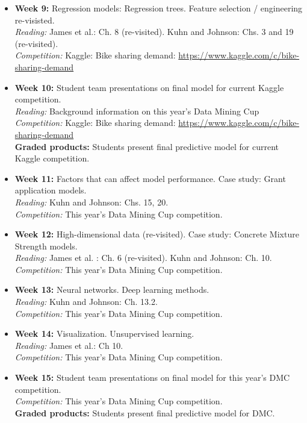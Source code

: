 \documentclass[11pt,oneside]{amsart}
\begin{document}
\begin{itemize}
\item \textbf{Week 9:} Regression models: Regression trees. Feature selection /
  engineering re-visisted.\\
\emph{Reading:} James et al.: Ch. 8 (re-visited). Kuhn and Johnson:
Chs. 3 and 19 (re-visited).\\
\emph{Competition:} Kaggle: Bike sharing demand: \url{https://www.kaggle.com/c/bike-sharing-demand}

\item \textbf{Week 10:} Student team presentations on final model for current Kaggle
  competition.\\
\emph{Reading:} Background information on this year's Data Mining Cup\\
\emph{Competition:} Kaggle: Bike sharing demand: \url{https://www.kaggle.com/c/bike-sharing-demand}\\
\textbf{Graded products:} Students present final predictive model for
current Kaggle competition.\\

\item \textbf{Week 11:} Factors that can affect model performance. Case study: Grant application models. \\
\emph{Reading:} Kuhn and Johnson: Chs. 15, 20. \\
\emph{Competition:} This year's Data Mining Cup competition.

\item \textbf{Week 12:} High-dimensional data (re-visited). Case study: Concrete Mixture Strength models.\\
\emph{Reading:} James et al. : Ch. 6 (re-visited). Kuhn and Johnson: Ch. 10.\\
\emph{Competition:} This year's Data Mining Cup competition.

\item \textbf{Week 13:} Neural networks. Deep learning methods. \\
\emph{Reading:} Kuhn and Johnson: Ch. 13.2. \\
\emph{Competition:} This year's Data Mining Cup competition.

\item \textbf{Week 14:} Visualization. Unsupervised learning.\\
\emph{Reading:} James et al.: Ch 10. \\
\emph{Competition:} This year's Data Mining Cup competition.

\item \textbf{Week 15:} Student team presentations on final model for
  this year's DMC  competition.\\
\emph{Competition:} This year's Data Mining Cup competition.\\
\textbf{Graded products:} Students present final predictive model for
DMC.

\end{itemize}
\end{document}
